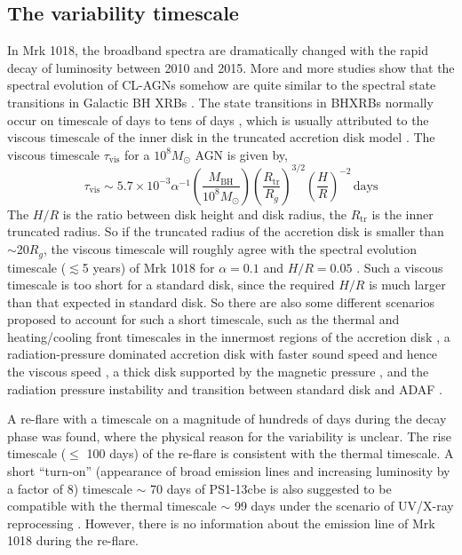 \subsection{The variability timescale}
\label{sec:timescale}
In Mrk 1018, the broadband spectra are dramatically changed with the rapid decay of luminosity \citep[see also ][]{2016A&A...593L...9H,2018MNRAS.480.3898N} between 2010 and 2015.
More and more studies show that the spectral evolution of CL-AGNs somehow are quite similar to the spectral state transitions in Galactic BH XRBs \citep{2018MNRAS.480.3898N,2019arXiv190904676R,2019ApJ...883...76R,2020MNRAS.492.2335L}. The state transitions in BHXRBs normally occur on timescale of days to tens of days \citep{2009ApJ...701.1940Y,2010MNRAS.403...61D}, which is usually
attributed to the viscous timescale of the inner disk in the truncated accretion disk model \citep[see reviews in ][]{2007A&ARv..15....1D}. The viscous timescale $\tau_\mathrm{vis}$ for a $10^{8} M_{\odot}$ AGN is given by,
\begin{equation}
\tau_\mathrm{vis} \sim 5.7\times 10^{-3} \alpha^{-1}(\frac{M_\mathrm{BH}}{10^8M_{\odot}})(\frac{R_\mathrm{tr}}{R_g})^{3/2} (\frac{H}{R})^{-2} \, \mathrm{days} 
\end{equation} 
 The $H/R$ is the ratio between disk height and disk radius, the $R_\mathrm{tr}$ is the inner truncated radius. So if the truncated radius of the accretion disk is smaller than  $\sim$20$R_{g}$, the viscous timescale will roughly agree with the spectral evolution timescale ($\lesssim$5 years) of Mrk 1018 for $\alpha=0.1$ and $H/R=0.05$ \citep[e.g.][]{2020MNRAS.492.2335L}. Such a viscous timescale is too short for a standard disk, since the required $H/R$ is much larger than that expected in standard disk. So there are also some different scenarios proposed to account for such a short timescale, such as the thermal and heating/cooling front timescales in the innermost regions of the accretion disk \citep{2018ApJ...864...27S}, a radiation-pressure dominated accretion disk with faster sound speed and hence the viscous speed \citep{2018MNRAS.480.3898N}, a thick disk supported by the magnetic pressure \citep{2019MNRAS.483L..17D}, and the radiation pressure instability and transition between standard disk and ADAF \citep{2020A&A...641A.167S}. 
 
A re-flare with a timescale on a magnitude of hundreds of days during the decay phase was found, where the physical reason for the variability is unclear. The rise timescale ($\leq$ 100 days) of the re-flare is consistent with the thermal timescale.  A short ``turn-on'' (appearance of broad emission lines and increasing luminosity by a factor of 8) timescale $\sim$ 70 days of PS1-13cbe is also suggested to be compatible with the thermal timescale $\sim$ 99 days under the scenario of UV/X-ray reprocessing \citep[][]{2019MNRAS.487.4057K}. However, there is no information about the emission line of Mrk 1018 during the re-flare. 

